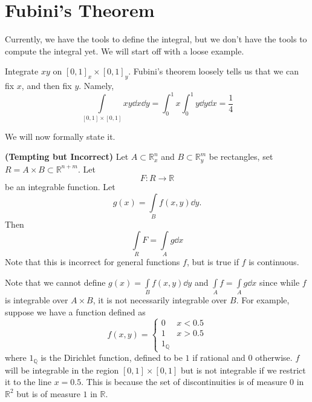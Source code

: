 \documentclass{article}
\numberwithin{equation}{section}
\begin{document}
\section{Fubini's Theorem}
Currently, we have the tools to define the integral, but we don't have the tools to compute the integral yet. We will start off with a loose example.
\begin{example}
    Integrate $xy$ on $[0,1]_x \times [0,1]_y.$ Fubini's theorem loosely tells us that we can fix $x$, and then fix $y$. Namely,
    \begin{equation}
        \int\limits_{[0,1]\times [0,1]}xy \dd{x}\dd{y} = \int_0^1 x \int_0^1 y \dd{y}\dd{x} = \frac{1}{4}
    \end{equation}
\end{example}
We will now formally state it.
\begin{theorem}
    \textbf{(Tempting but Incorrect)} Let $A\subset \mathbb{R}_x^n$ and $B\subset \mathbb{R}_y^m$ be rectangles, set $R=A\times B \subset \mathbb{R}^{n+m}.$ Let
    \begin{equation}
        F:R \rightarrow \mathbb{R}
    \end{equation}
    be an integrable function. Let
    \begin{equation}
        g(x) = \int\limits_{B} f(x,y) \dd{y}.
    \end{equation}
    Then
    \begin{equation}
        \int\limits_R F =  \int\limits_A g \dd{x}
    \end{equation}
    Note that this is incorrect for general functions $f$, but is true if $f$ is continuous.
\end{theorem}
\begin{warning}
    Note that we cannot define $g(x) = \int\limits_{B} f(x,y) \dd{y}$ and $\int\limits_A f = \int\limits_A g \dd{x}$ since while $f$ is integrable over $A\times B$, it is not necessarily integrable over $B$. For example, suppose we have a function defined as
    \begin{equation}
        f(x,y) = \begin{cases}
            0 & x < 0.5 \\
            1 & x > 0.5 \\
            1_{\mathbb{Q}}
        \end{cases}
    \end{equation}
    where $1_{\mathbb{Q}}$ is the Dirichlet function, defined to be $1$ if rational and $0$ otherwise. $f$ will be integrable in the region $[0,1]\times [0,1]$ but is not integrable if we restrict it to the line $x=0.5.$ This is because the set of discontinuities is of measure $0$ in $\mathbb{R}^2$ but is of measure $1$ in $\mathbb{R}$.
\end{warning}
\end{document}
